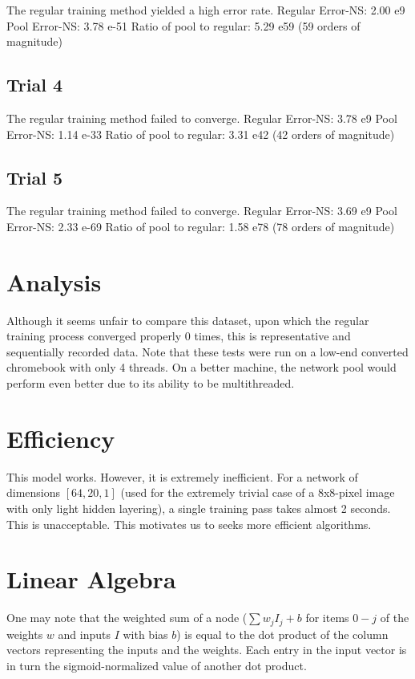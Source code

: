 \documentclass[8pt]{amsart}
\begin{document}
The regular training method yielded a high error rate.
Regular Error-NS: 2.00 e9
Pool Error-NS: 3.78 e-51
Ratio of pool to regular: 5.29 e59 (59 orders of magnitude)

\subsection{Trial 4}

The regular training method failed to converge.
Regular Error-NS: 3.78 e9
Pool Error-NS: 1.14 e-33
Ratio of pool to regular: 3.31 e42 (42 orders of magnitude)

\subsection{Trial 5}

The regular training method failed to converge.
Regular Error-NS: 3.69 e9
Pool Error-NS: 2.33 e-69
Ratio of pool to regular: 1.58 e78 (78 orders of magnitude)

\section{Analysis}

Although it seems unfair to compare this dataset, upon which the regular
training process converged properly 0 times, this is representative and
sequentially recorded data. Note that these tests were run on a low-end
converted chromebook with only 4 threads. On a better machine, the
network pool would perform even better due to its ability to be multithreaded.

\section{Efficiency}

This model works. However, it is extremely inefficient. For a network
of dimensions $[64, 20, 1]$ (used for the extremely trivial case of a
8x8-pixel image with only light hidden layering), a single training pass
takes almost 2 seconds. This is unacceptable. This motivates us to seeks more
efficient algorithms.

\section{Linear Algebra}

One may note that the weighted sum of a node ($\sum{w_j I_j} + b$ for items $0-j$
of the weights $w$ and inputs $I$ with bias $b$) is equal to the dot product
of the column vectors representing the inputs and the weights. Each entry in
the input vector is in turn the sigmoid-normalized value of another dot product.
\end{document}
